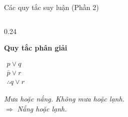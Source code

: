 \documentclass[aspectratio=169, 11pt]{beamer}
\begin{document}
\begin{frame}{Các quy tắc suy luận (Phần 2)}
\begin{columns}[t, onlytextwidth]
\begin{column}{0.24\textwidth}
    \centering
    \parbox[t][0.85cm][t]{\linewidth}{\centering\color{uitblue}\textbf{Quy tắc phân giải}}\par
    \vspace{0.15cm}
    $\begin{array}{l}
      p \lor q \\
      \bar{p} \lor r \\
      \hline
      \therefore q \lor r
    \end{array}$\par
    \vspace{0.35cm}
    \footnotesize\textit{Mưa hoặc nắng. Không mưa hoặc lạnh.}\\
    $\Rightarrow$ \textit{Nắng hoặc lạnh.}
  \end{column}
\end{columns}
\end{frame}
\end{document}
